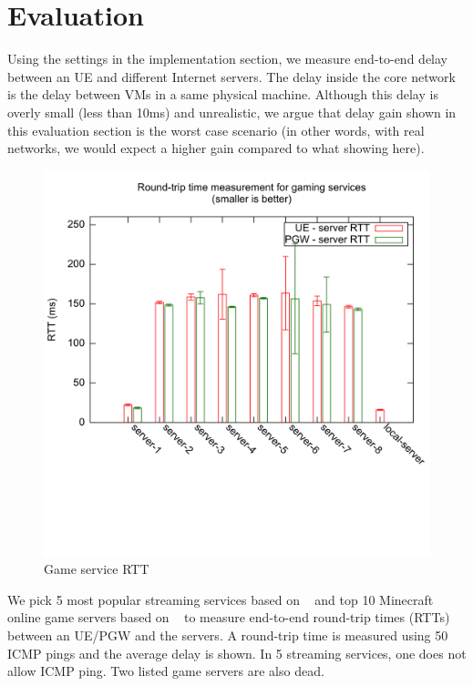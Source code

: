 \section{Evaluation}

Using the settings in the implementation section, we measure 
end-to-end delay between an UE and different Internet servers. 
The delay inside the core network is the delay 
between VMs in a same physical machine. Although this 
delay is overly small (less than 10ms) and unrealistic, we argue that 
delay gain shown in this evaluation section is 
the worst case scenario (in other words, with real networks, we 
would expect a higher gain compared to what showing here).

\begin{figure}[hbtp]
\centering
\includegraphics[scale=0.11]{./figure/game-server-rtt.png}
\caption{Game service RTT}
\label{fig:game-rtt}
\end{figure}

We pick 5 most popular streaming services based on ~\cite{http://www.techsupportalert.com:2013} 
and top 10 Minecraft ~\cite{Minecraft.net:2013} online game servers based on ~\cite{http://www.serverpact.com:2013} 
to measure end-to-end round-trip times (RTTs) between an UE/PGW and the servers. A round-trip time is 
measured using 50 ICMP pings and the average delay is shown. 
In 5 streaming services, one does not allow ICMP ping. Two listed game servers are
also dead.

